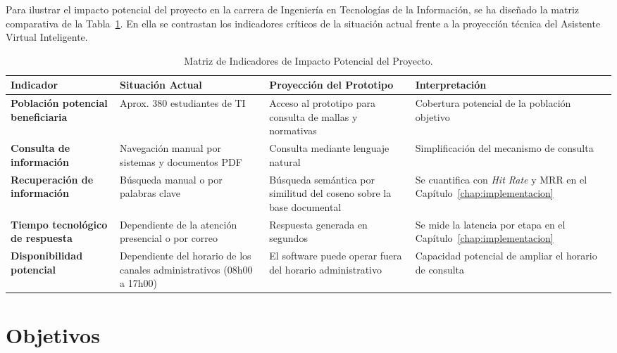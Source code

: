 Para ilustrar el impacto potencial del proyecto en la carrera de Ingeniería en Tecnologías de la Información, se ha diseñado la matriz comparativa de la Tabla~\ref{tab:cuantificacion_impacto}. En ella se contrastan los indicadores críticos de la situación actual frente a la proyección técnica del Asistente Virtual Inteligente.

\begin{table}[htbp]
  \caption{Matriz de Indicadores de Impacto Potencial del Proyecto.}
  \label{tab:cuantificacion_impacto}
\centering
\small
\setlength{\tabcolsep}{4pt}
\renewcommand{\arraystretch}{1.25}
\begin{tabular}{|>{\raggedright\arraybackslash}p{2.8cm}|>{\raggedright\arraybackslash}p{3.3cm}|>{\raggedright\arraybackslash}p{3.3cm}|>{\raggedright\arraybackslash}p{3.0cm}|}
\hline
\rowcolor[HTML]{EFEFEF}
\textbf{Indicador} & \textbf{Situación Actual} & \textbf{Proyección del Prototipo} & \textbf{Interpretación} \\ \hline
\textbf{Población potencial beneficiaria} & Aprox. 380 estudiantes de TI & Acceso al prototipo para consulta de mallas y normativas & Cobertura potencial de la población objetivo \\ \hline
\textbf{Consulta de información} & Navegación manual por sistemas y documentos PDF & Consulta mediante lenguaje natural & Simplificación del mecanismo de consulta \\ \hline
\textbf{Recuperación de información} & Búsqueda manual o por palabras clave & Búsqueda semántica por similitud del coseno sobre la base documental & Se cuantifica con \textit{Hit Rate} y MRR en el Capítulo~\ref{chap:implementacion} \\ \hline
\textbf{Tiempo tecnológico de respuesta} & Dependiente de la atención presencial o por correo & Respuesta generada en segundos & Se mide la latencia por etapa en el Capítulo~\ref{chap:implementacion} \\ \hline
\textbf{Disponibilidad potencial} & Dependiente del horario de los canales administrativos (08h00 a 17h00) & El software puede operar fuera del horario administrativo & Capacidad potencial de ampliar el horario de consulta \\ \hline
\end{tabular}
\elaboradopor{\autorTFG}
\end{table}

\clearpage
\section{Objetivos}
